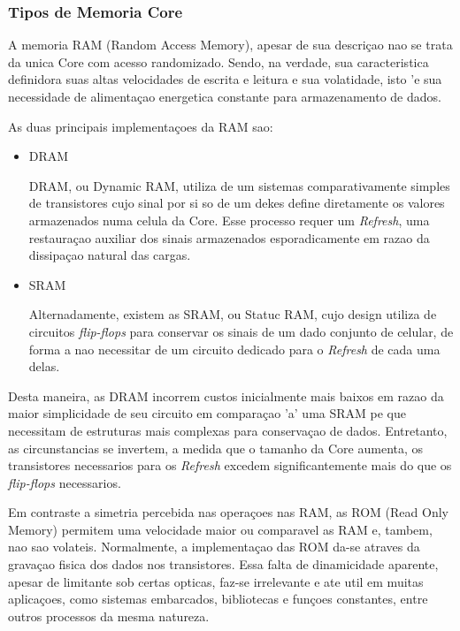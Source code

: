 \documentclass[12pt]{article}
\begin{document}
\subsubsection*{Tipos de Memoria Core}
A memoria RAM (Random Access Memory), apesar de sua descriçao nao se trata da unica Core com acesso randomizado. Sendo, na verdade, sua caracteristica definidora suas altas velocidades de escrita e leitura e sua volatidade, isto 'e sua necessidade de alimentaçao energetica constante para armazenamento de dados.

As duas principais implementaçoes da RAM sao:
\begin{itemize}

\item DRAM

DRAM, ou Dynamic RAM, utiliza de um sistemas comparativamente simples de transistores cujo sinal por si so de um dekes define diretamente os valores armazenados numa celula da Core. Esse processo requer um \textit{Refresh}, uma restauraçao auxiliar dos sinais armazenados esporadicamente em razao da dissipaçao natural das cargas. 

\item SRAM

Alternadamente, existem as SRAM, ou Statuc RAM, cujo design utiliza de circuitos \textit{flip-flops} para conservar os sinais de um dado conjunto de celular, de forma a nao necessitar de um circuito dedicado para o \textit{Refresh} de cada uma delas. 

\end{itemize}

Desta maneira, as DRAM incorrem custos inicialmente mais baixos em razao da maior simplicidade de seu circuito em comparaçao 'a' uma SRAM pe que necessitam de estruturas mais complexas para conservaçao de dados. Entretanto, as circunstancias se invertem, a medida que o tamanho da Core aumenta, os transistores necessarios para os \textit{Refresh} excedem significantemente mais do que os \textit{flip-flops} necessarios.

Em contraste a simetria percebida nas operaçoes nas RAM, as ROM (Read Only Memory) permitem uma velocidade maior ou comparavel as RAM e, tambem, nao sao volateis. Normalmente, a implementaçao das ROM da-se atraves da gravaçao fisica dos dados nos transistores. Essa falta de dinamicidade aparente, apesar de limitante sob certas opticas, faz-se irrelevante e ate util em muitas aplicaçoes, como sistemas embarcados, bibliotecas e funçoes constantes, entre outros processos da mesma natureza.
\end{document}

